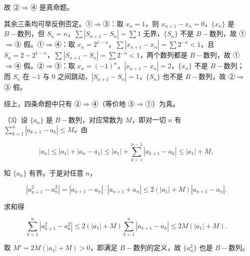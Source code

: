 \begin{answer}
故 ②$\Rightarrow$④ 是真命题。

其余三条均可举反例否定。①$\Rightarrow$③：取 $x_n=1$，则 $x_{n+1}-x_n=0$，$\{x_n\}$ 是 $B-$数列，但 $S_n=n$，$\sum|S_{n+1}-S_n|=\sum1$ 无界，$\{S_n\}$ 不是 $B-$数列，故 ①$\Rightarrow$③ 假。①$\Rightarrow$④：取 $x_n=2^{1-n}$，$\sum|x_{n+1}-x_n|=\sum2^{-n}<1$，且 $S_n=2-2^{1-n}$，$\sum|S_{n+1}-S_n|=\sum2^{-n}<1$，两个数列都是 $B-$数列，故 ①$\Rightarrow$④ 假。②$\Rightarrow$③：取 $x_n=(-1)^n$，$\left|x_{n+1}-x_n\right|=2$，$\{x_n\}$ 不是 $B-$数列；而 $S_n$ 在 $-1$ 与 $0$ 之间跳动，$\left|S_{n+1}-S_n\right|=1$，$\{S_n\}$ 也不是 $B-$数列，故 ②$\Rightarrow$③ 假。

综上，四条命题中只有 ②$\Rightarrow$④（等价地 ③$\Rightarrow$①）为真。

（3）设 $\{a_n\}$ 是 $B-$数列，对应常数为 $M$，即对一切 $n$ 有 $\sum\limits_{k=1}^{n}\left|a_{k+1}-a_k\right|\leqslant M$。由

\nopagebreak[4]
\[\left|a_n\right|\leqslant\left|a_1\right|+\left|a_n-a_1\right|\leqslant\left|a_1\right|+\sum_{k=1}^{n-1}\left|a_{k+1}-a_k\right|\leqslant\left|a_1\right|+M,\]

知 $\{a_n\}$ 有界。于是对任意 $n$，

\nopagebreak[4]
\[\left|a_{n+1}^2-a_n^2\right|=\left|a_{n+1}-a_n\right|\cdot\left|a_{n+1}+a_n\right|\leqslant2\left(\left|a_1\right|+M\right)\left|a_{n+1}-a_n\right|.\]

求和得

\nopagebreak[4]
\[\sum_{k=1}^{n}\left|a_{k+1}^2-a_k^2\right|\leqslant2\left(\left|a_1\right|+M\right)\sum_{k=1}^{n}\left|a_{k+1}-a_k\right|\leqslant2M\left(\left|a_1\right|+M\right).\]

取 $M'=2M\left(\left|a_1\right|+M\right)>0$，即满足 $B-$数列的定义，故 $\{a_n^2\}$ 也是 $B-$数列。


\end{answer}